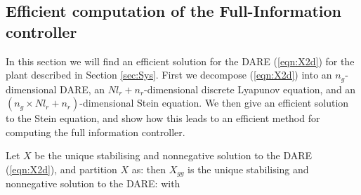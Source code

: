\label{sec:H2FI}

\subsection{Efficient computation of the Full-Information controller}
\label{subsec:FIEff}

In this section we will find an efficient solution for the DARE (\ref{eqn:X2d}) for the plant described in Section \ref{sec:Sys}. First we decompose (\ref{eqn:X2d}) into an $n_g$-dimensional DARE, an $Nl_r+n_r$-dimensional discrete Lyapunov equation, and an $(n_g\times Nl_r+n_r)$-dimensional Stein equation. We then give an efficient solution to the Stein equation, and show how this leads to an efficient method for computing the full information controller.

\begin{lem}
Let $X$ be the unique stabilising and nonnegative solution to the DARE (\ref{eqn:X2d}), and partition $X$ as:
%
%
then $X_{gg}$ is the unique stabilising and nonnegative solution to the DARE:
with
\end{lem}

